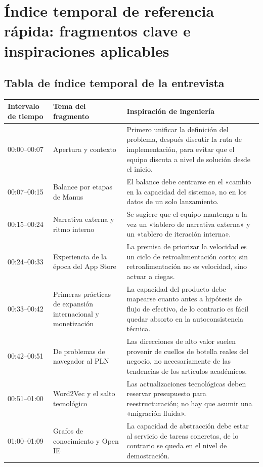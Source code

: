\section{Índice temporal de referencia rápida: fragmentos clave e inspiraciones aplicables}

\subsection{Tabla de índice temporal de la entrevista}

\begin{longtable}{p{2.6cm}p{4.0cm}p{6.6cm}}
\toprule
Intervalo de tiempo & Tema del fragmento & Inspiración de ingeniería \\
\midrule
\endhead
00:00--00:07 & Apertura y contexto & Primero unificar la definición del problema, después discutir la ruta de implementación, para evitar que el equipo discuta a nivel de solución desde el inicio. \\
00:07--00:15 & Balance por etapas de Manus & El balance debe centrarse en el «cambio en la capacidad del sistema», no en los datos de un solo lanzamiento. \\
00:15--00:24 & Narrativa externa y ritmo interno & Se sugiere que el equipo mantenga a la vez un «tablero de narrativa externa» y un «tablero de iteración interna». \\
00:24--00:33 & Experiencia de la época del App Store & La premisa de priorizar la velocidad es un ciclo de retroalimentación corto; sin retroalimentación no es velocidad, sino actuar a ciegas. \\
00:33--00:42 & Primeras prácticas de expansión internacional y monetización & La capacidad del producto debe mapearse cuanto antes a hipótesis de flujo de efectivo, de lo contrario es fácil quedar absorto en la autoconsistencia técnica. \\
00:42--00:51 & De problemas de navegador al PLN & Las direcciones de alto valor suelen provenir de cuellos de botella reales del negocio, no necesariamente de las tendencias de los artículos académicos. \\
00:51--01:00 & Word2Vec y el salto tecnológico & Las actualizaciones tecnológicas deben reservar presupuesto para reestructuración; no hay que asumir una «migración fluida». \\
01:00--01:09 & Grafos de conocimiento y Open IE & La capacidad de abstracción debe estar al servicio de tareas concretas, de lo contrario se queda en el nivel de demostración. \\

\end{longtable}
